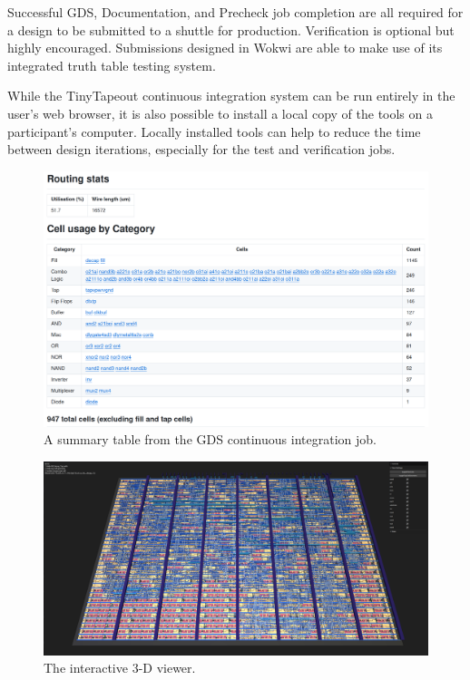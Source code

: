 Successful GDS, Documentation, and Precheck job completion are all required for a design to be submitted to a shuttle for production.
Verification is optional but highly encouraged. Submissions designed in Wokwi are able to make use of its integrated truth table testing system\cite{automatedtesting}.

While the TinyTapeout continuous integration system can be run entirely in the user's web browser, it is also possible to install a local copy of the tools\cite{localinstall} on a participant's computer. Locally installed tools can help to reduce the time between design iterations, especially for the test and verification jobs.

\begin{figure}[!t]
\centering
\includegraphics[width=\columnwidth]{./Figs/gh action cell stats.png}
\caption{A summary table from the GDS continuous integration job.}
\label{fig:summary_table_GDS_job}
\end{figure}

\begin{figure}[!t]
\centering
\includegraphics[width=\columnwidth]{./Figs/gh action gds 3d view.png}
\caption{The interactive 3-D viewer.}
\label{fig:interactive_3D_viewer}
\end{figure}
